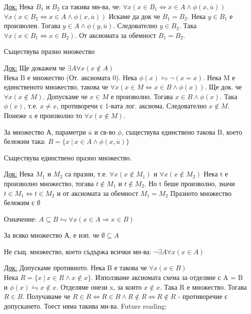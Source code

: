 \documentclass[fleqn, titlepage, 12pt]{report}
\begin{document}
\underline{Док:} Нека $B_1$ и $B_2$ са такива мн-ва, че:
$\forall{x}(x \in B_1 \Leftrightarrow x \in A \land \phi (x, \overline{u}))$
$\forall{x}(x \in B_2 \Leftrightarrow x \in A \land \phi (x, \overline{u}))$
Искаме да док че $B_1 = B_2$. Нека $y \in B_1$ е произволен. Тогава $y \in A \land \phi (y, \overline{u})$.
Следователно $y \in B_2$. Така $\forall{x}(x \in B_1 \Leftrightarrow x \in B_2)$. От аксиомата за обемност $B_1 = B_2$.
\bigbreak

 Съществува празно множество
\bigbreak

\underline{Док:} Ще докажем че $\exists{A}\forall{x}(x \notin A)$ \\
Нека B е множество (От. аксиомата 0). Нека $\phi (x) \leftrightharpoons \lnot (x = x)$.
Нека M е единственото множество, такова че
$\forall{x}(x \in M \Leftrightarrow x \in B \land \phi (x))$. Ще док. че $\forall{x}(x \notin M)$.
Допускаме че $x \in M$ е произволно. Тогава $x \in B \land \phi (x)$. Така $\phi (x)$, т.е. $x \neq x$,
противоречи с 1-вата лог. аксиома. Следователно $x \notin M$. Понеже x е произволно то $\forall{x}(x \notin M)$.
\bigbreak

 За множество А, параметри $\overline{u}$ и св-во $\phi$, съществува единствено такова B, което бележим така:
$B = \{x\ |\ x \in A \land \phi (x, \overline{u})\}$
\bigbreak

 Съществува единствено празно множество.
\bigbreak

\underline{Док:} Нека $M_1$ и $M_2$ са празни, т.е. $\forall{x}(x \notin M_1)$ и $\forall{x}(x \notin M_2)$
Нека t е произволно множество, тогава $t \notin M_1$ и $t \notin M_2$. Но t беше произволно,
значи $t \in M_1 \Leftrightarrow t \in M_2$ и от аксиомата за обемност $M_1 = M_2$
Празното множество бележим с $\emptyset$
\bigbreak

Означение: $A \subseteq B \leftrightharpoons \forall{x}(x \in A \Rightarrow x \in B)$
\bigbreak

 За всяко множество А, е изп. че $\emptyset \subseteq A$
\bigbreak

 Не същ. множество, което съдържа всички мн-ва: $\lnot \exists{A}\forall{x}(x \in A)$
\bigbreak

\underline{Док:} Допускаме противното. Нека B е такова че $\forall{x}(x \in B)$\\
Нека $R = \{x\ |\ x \in R \land x \notin x\}$. Използваме аксиомата схема за отделяне с A = B и
$\phi (x) \leftrightharpoons x \notin x$.
Отделяме онези x, за които $x \notin x$. Така R е множество. Тогава $R \in B$.
Получаваме че $R \in R \Leftrightarrow R \in B \land R \notin R \Leftrightarrow R \notin R$ - противоречие с допускането.
Тоест няма такива мн-ва.
\bigbreak Future reading:
\end{document}
